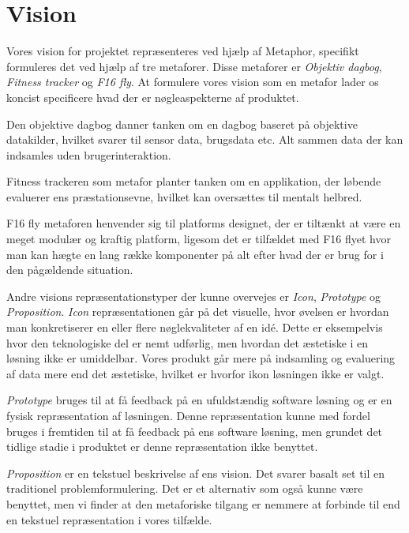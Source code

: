 \section{Vision}
Vores vision for projektet repræsenteres ved hjælp af Metaphor, specifikt formuleres det ved hjælp af tre metaforer.
Disse metaforer er \textit{Objektiv dagbog}, \textit{Fitness tracker} og \textit{F16 fly}.
At formulere vores vision som en metafor lader os koncist specificere hvad der er nøgleaspekterne af produktet.

Den objektive dagbog danner tanken om en dagbog baseret på objektive datakilder, hvilket svarer til sensor data, brugsdata etc.
Alt sammen data der kan indsamles uden brugerinteraktion.

Fitness trackeren som metafor planter tanken om en applikation, der løbende evaluerer ens præstationsevne, hvilket kan oversættes til mentalt helbred.

F16 fly metaforen henvender sig til platforms designet, der er tiltænkt at være en meget modulær og kraftig platform, ligesom det er tilfældet med F16 flyet hvor man kan hægte en lang række komponenter på alt efter hvad der er brug for i den pågældende situation.

Andre visions repræsentationstyper der kunne overvejes er \textit{Icon}, \textit{Prototype} og \textit{Proposition}.
\textit{Icon} repræsentationen går på det visuelle, hvor øvelsen er hvordan man konkretiserer en eller flere nøglekvaliteter af en idé.
Dette er eksempelvis hvor den teknologiske del er nemt udførlig, men hvordan det æstetiske i en løsning ikke er umiddelbar.
Vores produkt går mere på indsamling og evaluering af data mere end det æstetiske, hvilket er hvorfor ikon løsningen ikke er valgt.

\textit{Prototype} bruges til at få feedback på en ufuldstændig software løsning og er en fysisk repræsentation af løsningen.
Denne repræsentation kunne med fordel bruges i fremtiden til at få feedback på ens software løsning, men grundet det tidlige stadie i produktet er denne repræsentation ikke benyttet.

\textit{Proposition} er en tekstuel beskrivelse af ens vision. Det svarer basalt set til en traditionel problemformulering.
Det er et alternativ som også kunne være benyttet, men vi finder at den metaforiske tilgang er nemmere at forbinde til end en tekstuel repræsentation i vores tilfælde.
